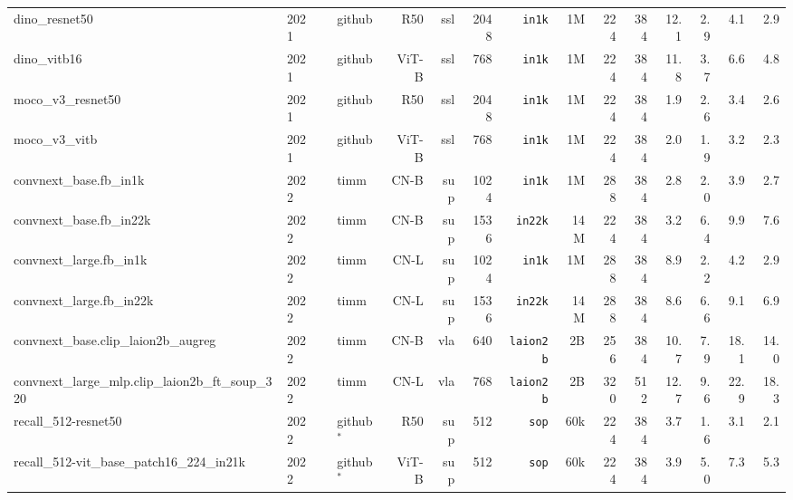 \begin{tabular}{llllrrrrrrrRRRR}
dino\_resnet50                                    & 2021 & \cite{ctm+21}            & github      & R50   & ssl      & 2048 & \texttt{in1k}      & 1M   & 224 & 384 & 12.1 & 2.9 & 4.1   & 2.9  \\
dino\_vitb16                                      & 2021 & \cite{ctm+21}            & github      & ViT-B & ssl      & 768  & \texttt{in1k}      & 1M   & 224 & 384 & 11.8 & 3.7 & 6.6   & 4.8  \\
moco\_v3\_resnet50                                & 2021 & \cite{hfw+20}            & github      & R50   & ssl      & 2048 & \texttt{in1k}      & 1M   & 224 & 384 & 1.9  & 2.6 & 3.4   & 2.6  \\
moco\_v3\_vitb                                    & 2021 & \cite{hfw+20}            & github      & ViT-B & ssl      & 768  & \texttt{in1k}      & 1M   & 224 & 384 & 2.0  & 1.9 & 3.2   & 2.3  \\
convnext\_base.fb\_in1k                           & 2022 & \cite{convnext}          & timm        & CN-B  & sup      & 1024 & \texttt{in1k}      & 1M   & 288 & 384 & 2.8  & 2.0 & 3.9   & 2.7  \\
convnext\_base.fb\_in22k                          & 2022 & \cite{convnext}          & timm        & CN-B  & sup      & 1536 & \texttt{in22k}     & 14M  & 224 & 384 & 3.2  & 6.4 & 9.9   & 7.6  \\
convnext\_large.fb\_in1k                          & 2022 & \cite{convnext}          & timm        & CN-L  & sup      & 1024 & \texttt{in1k}      & 1M   & 288 & 384 & 8.9  & 2.2 & 4.2   & 2.9  \\
convnext\_large.fb\_in22k                         & 2022 & \cite{convnext}          & timm        & CN-L  & sup      & 1536 & \texttt{in22k}     & 14M  & 288 & 384 & 8.6  & 6.6 & 9.1   & 6.9  \\
convnext\_base.clip\_laion2b\_augreg              & 2022 & \cite{iww+21,convnext}   & timm        & CN-B  & vla      & 640  & \texttt{laion2b}   & 2B   & 256 & 384 & 10.7 & 7.9 & 18.1  & 14.0 \\
convnext\_large\_mlp.clip\_laion2b\_ft\_soup\_320 & 2022 & \cite{iww+21,convnext}   & timm        & CN-L  & vla      & 768  & \texttt{laion2b}   & 2B   & 320 & 512 & 12.7 & 9.6 & 22.9  & 18.3 \\
recall\_512-resnet50                              & 2022 & \cite{ptm+22}            & github$^*$  & R50   & sup      & 512  & \texttt{sop}       & 60k  & 224 & 384 & 3.7  & 1.6 & 3.1   & 2.1  \\
recall\_512-vit\_base\_patch16\_224\_in21k        & 2022 & \cite{ptm+22}            & github$^*$  & ViT-B & sup      & 512 & \texttt{sop}        & 60k  & 224 & 384 & 3.9  & 5.0 & 7.3   & 5.3  \\

\end{tabular}
